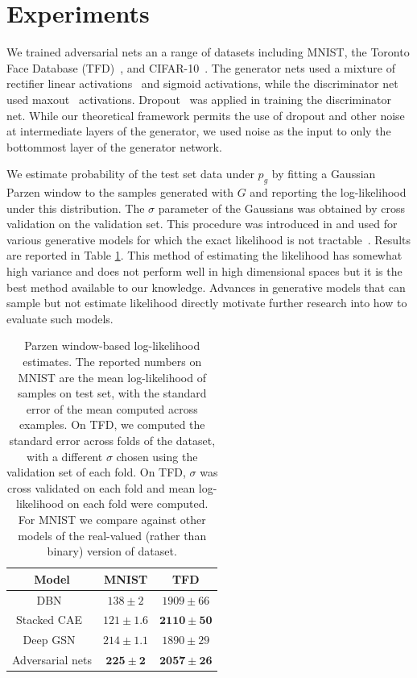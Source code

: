 \documentclass{article} %
\begin{document}
\section{Experiments}


We trained adversarial nets an a range of datasets including MNIST\citep{LeCun+98}, the
Toronto Face Database (TFD)~\cite{Susskind2010}, and CIFAR-10~\citep{KrizhevskyHinton2009}.
The generator nets used a mixture of rectifier linear
activations~\cite{Jarrett-ICCV2009,Glorot+al-AI-2011-small} and sigmoid
activations, while the discriminator net used maxout~\cite{Goodfellow_maxout_2013} activations.
Dropout~\cite{Hinton-et-al-arxiv2012} was applied in training the
discriminator net. While our theoretical framework permits the use of dropout and other noise
at intermediate layers of the generator, we used noise as the input to only the bottommost layer
of the generator network.

We estimate probability of the test set data under $p_g$ by fitting a Gaussian Parzen window to the samples
generated with $G$ and reporting the log-likelihood under this distribution.
The $\sigma$ parameter of the Gaussians
was obtained by cross validation on the validation set. This procedure was introduced in  \citet{Breuleux+Bengio-2011}
and used for various generative models for which the exact likelihood is
not
tractable~\citep{Rifai-icml2012,Bengio-et-al-ICML2013,Bengio-et-al-ICML2014}. Results
are reported in Table \ref{table:parzen}. This method of estimating the likelihood has somewhat high variance
and does not perform well in high dimensional spaces but it is the best method available to our knowledge.
Advances in generative models that can sample but not estimate likelihood directly motivate further research
into how to evaluate such models.


\begin{table}
\centering
\begin{tabular}{c|c|c}
Model & MNIST & TFD \\
\hline
DBN~\citep{Bengio-et-al-ICML2013} & $138 \pm 2$ & $1909 \pm 66$ \\
Stacked CAE~\citep{Bengio-et-al-ICML2013} & $121 \pm 1.6$ & $\mathbf{2110 \pm 50}$ \\
Deep GSN~\citep{Bengio-et-al-ICML-2014} & $214 \pm 1.1$ & $1890 \pm 29$ \\
Adversarial nets & $\mathbf{225 \pm 2}$ & $\mathbf{2057 \pm 26}$
\end{tabular}
\caption{\small
Parzen window-based log-likelihood estimates. The reported numbers on MNIST are the mean log-likelihood of samples on test set,
with the standard error of the mean computed across examples.
On TFD, we computed the standard error across folds of the dataset, with a different $\sigma$ chosen using the validation set
of each fold.
On TFD, $\sigma$ was cross validated on each fold and mean log-likelihood on each fold were computed.
For MNIST we compare against other models of the real-valued (rather than binary) version of dataset.}
\label{table:parzen}
\end{table}
\end{document}
